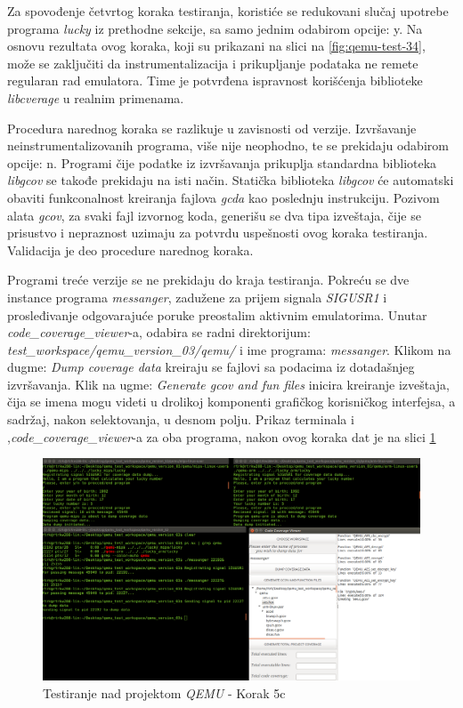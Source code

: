 \documentclass[12pt,oneside]{memoir}
\newcommand{\strano}[1]{\textit{#1}}
\begin{document}
Za spovođenje četvrtog koraka testiranja, koristiće se redukovani slučaj upotrebe programa \strano{lucky} iz prethodne sekcije, sa samo jednim odabirom opcije: y. Na osnovu rezultata ovog koraka, koji su prikazani na slici na \ref{fig:qemu-test-34}, može se zaključiti da instrumentalizacija i prikupljanje podataka ne remete regularan rad emulatora. Time je potvrđena ispravnost korišćenja biblioteke \strano{libcverage} u realnim primenama. 

Procedura narednog koraka se razlikuje u zavisnosti od verzije. Izvršavanje neinstrumentalizovanih programa, više nije neophodno, te se prekidaju odabirom opcije: n. Programi čije podatke iz izvršavanja prikuplja standardna biblioteka \strano{libgcov} se takođe prekidaju na isti način. Statička biblioteka \strano{libgcov} će automatski obaviti funkconalnost kreiranja fajlova \strano{gcda} kao poslednju instrukciju. Pozivom alata \strano{gcov}, za svaki fajl izvornog koda, generišu se dva tipa izveštaja, čije se prisustvo i nepraznost uzimaju za potvrdu uspešnosti ovog koraka testiranja. Validacija je deo procedure narednog koraka. 

Programi treće verzije se ne prekidaju do kraja testiranja. Pokreću se dve instance programa \strano{messanger}, zadužene za prijem signala \strano{SIGUSR1} i prosleđivanje odgovarajuće poruke preostalim aktivnim emulatorima. Unutar \strano{code\_coverage\_viewer}-a, odabira se radni direktorijum: \strano{test\_workspace/qemu\_version\_03/qemu/} i ime programa: \strano{messanger}. Klikom na dugme: \strano{Dump coverage data} kreiraju se fajlovi sa podacima iz dotadašnjeg izvršavanja. Klik na ugme: \strano{Generate gcov and fun files} inicira kreiranje izveštaja, čija se imena mogu videti u drolikoj komponenti grafičkog korisničkog interfejsa, a sadržaj, nakon selektovanja, u desnom polju. Prikaz terminala i ,\strano{code\_coverage\_viewer}-a za oba programa, nakon ovog koraka dat je na slici \ref{fig:qemu-test-5}

\begin{figure}[!ht]
  \centering
  \includegraphics[width=\textwidth]{img/qemu-test-5.png}
  \caption{Testiranje nad projektom \strano{QEMU} - Korak 5c}
  \label{fig:qemu-test-5}
\end{figure} 
\end{document}
